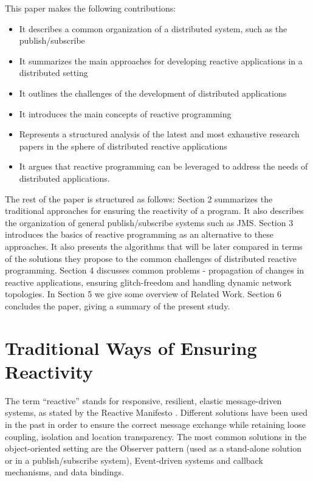 \documentclass{sigplanconf}
\begin{document}
This paper makes the following contributions:

\begin{itemize} \itemsep1pt \parskip0pt 
  \item It describes a common organization of a distributed system, such as the publish/subscribe 
  \item It summarizes the main approaches for developing reactive applications in a distributed setting
  \item It outlines the challenges of the development of distributed applications
  \item It introduces the main concepts of reactive programming
  \item Represents a structured analysis of the latest and most exhaustive research papers in the sphere of distributed reactive applications
  \item It argues that reactive programming can be leveraged to address the needs of distributed applications.
\end{itemize}

The rest of the paper is structured as follows: Section 2 summarizes the traditional approaches for ensuring the reactivity of a program. It also describes the organization of general publish/subscribe systems such as JMS. Section 3 introduces the basics of reactive programming as an alternative to these approaches. It also presents the algorithms that will be later compared in terms of the solutions they propose to the common challenges of distributed reactive programming. Section 4 discusses common problems - propagation of changes in reactive applications, ensuring glitch-freedom and handling dynamic network topologies. In Section 5 we give some overview of Related Work. Section 6 concludes the paper, giving a summary of the present study.

\section{Traditional Ways of Ensuring Reactivity}

The term “reactive” stands for responsive, resilient, elastic message-driven systems, as stated by the Reactive Manifesto \cite{rm}. Different solutions have been used in the past in order to ensure the correct message exchange while retaining loose coupling, isolation and location transparency. The most common solutions in the object-oriented setting are the Observer pattern (used as a stand-alone solution or in a publish/subscribe system), Event-driven systems and callback mechanisms, and data bindings.
\end{document}
